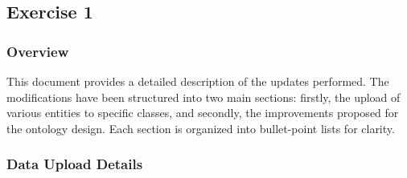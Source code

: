 \subsection{Exercise 1}

\subsubsection{Overview}

This document provides a detailed description of the updates performed. The modifications have been structured into two main sections: firstly, the upload of various entities to specific classes, and secondly, the improvements proposed for the ontology design. Each section is organized into bullet-point lists for clarity.

\subsubsection{Data Upload Details}


